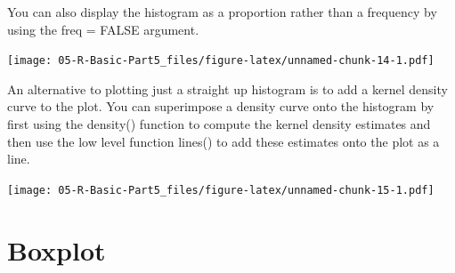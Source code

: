 \documentclass[
]{book}
\newenvironment{Shaded}{\begin{snugshade}}{\end{snugshade}}
\newcommand{\AttributeTok}[1]{\textcolor[rgb]{0.13,0.29,0.53}{#1}}
\newcommand{\ConstantTok}[1]{\textcolor[rgb]{0.56,0.35,0.01}{#1}}
\newcommand{\DecValTok}[1]{\textcolor[rgb]{0.00,0.00,0.81}{#1}}
\newcommand{\FunctionTok}[1]{\textcolor[rgb]{0.13,0.29,0.53}{\textbf{#1}}}
\newcommand{\NormalTok}[1]{#1}
\newcommand{\OtherTok}[1]{\textcolor[rgb]{0.56,0.35,0.01}{#1}}
\newcommand{\SpecialCharTok}[1]{\textcolor[rgb]{0.81,0.36,0.00}{\textbf{#1}}}
\newcommand{\StringTok}[1]{\textcolor[rgb]{0.31,0.60,0.02}{#1}}
\begin{document}
You can also display the histogram as a proportion rather than a frequency by using the freq = FALSE argument.

\begin{Shaded}
\end{Shaded}

\texttt{[image: 05-R-Basic-Part5\_files/figure-latex/unnamed-chunk-14-1.pdf]}

An alternative to plotting just a straight up histogram is to add a kernel density curve to the plot. You can superimpose a density curve onto the histogram by first using the density() function to compute the kernel density estimates and then use the low level function lines() to add these estimates onto the plot as a line.

\begin{Shaded}
\end{Shaded}

\texttt{[image: 05-R-Basic-Part5\_files/figure-latex/unnamed-chunk-15-1.pdf]}

\section*{Boxplot}\label{boxplot}
\end{document}
